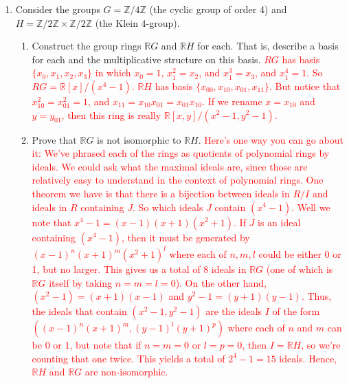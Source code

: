 \documentclass[12pt]{article}
\newcommand{\bbR}{\mathbb{R}}
\newcommand{\bbZ}{\mathbb{Z}}
\newcommand{\solution}[1]{\textcolor{red}{#1}}
\begin{document}
\begin{enumerate}
\item Consider the groups $G=\bbZ/4\bbZ$ (the cyclic group of order 4) and $H=\bbZ/2\bbZ \times
  \bbZ/2\bbZ$ (the Klein 4-group).
  \begin{enumerate}
  \item Construct the group rings $\bbR G$ and $\bbR H$ for each. That
    is, describe a basis for each and the multiplicative structure on
    this basis.
\solution{$RG$ has basis $\{x_0, x_1,x_2, x_3\}$ in which $x_0=1$,
  $x_1^2=x_2$, and $x_1^3=x_3$, and $x_1^4=1$. So
  $RG=\bbR[x]/(x^4-1)$. 
$\bbR H$ has basis $\{x_{00}, x_{10}, x_{01}, x_{11}\}$. But notice
that $x_{10}^2=x_{01}^2=1$, and $x_{11}=x_{10}x_{01}=x_{01}x_{10}$. If
we rename $x=x_{10}$ and $y=y_{01}$, then this ring is really
$\bbR[x,y]/(x^2-1, y^2-1)$. }
  \item Prove that $\bbR G$ is not isomorphic to $\bbR H$. 
\solution{
Here's one way you can go about it: We've phrased each of the rings as
quotients of polynomial rings by ideals. We could ask what the maximal
ideals are, since those are relatively easy to understand in the
context of polynomial rings. 
One theorem we have is that there is a bijection between ideals in
$R/I$ and ideals in $R$ containing $J$. So which ideals $J$ contain
$(x^4-1)$. Well we note that $x^4-1=(x-1)(x+1)(x^2+1)$. If $J$ is an
ideal containing $(x^4-1)$, then it must be generated by
$(x-1)^n(x+1)^m(x^2+1)^l$ where each of $n,m,l$ could be either 0 or
1, but no larger. This gives us a total of 8 ideals in $\bbR G$ (one
of which is $\bbR G$ itself by taking $n=m=l=0$). 
On the other hand, $(x^2-1)=(x+1)(x-1)$ and $y^2-1=(y+1)(y-1)$. Thus,
the ideals that contain $(x^2-1,y^2-1)$ are the ideals $I$ of the form $(
(x-1)^n(x+1)^m, (y-1)^l(y+1)^p)$ where each of $n$ and $m$ can be $0$
or $1$, but note that if $n=m=0$ or $l=p=0$, then $I=\bbR H$, so we're
counting that one twice. This yields a total of $2^4-1=15$
ideals. Hence, $\bbR H$ and $\bbR G$ are non-isomorphic. }
  \end{enumerate}



\end{enumerate}
\end{document}
